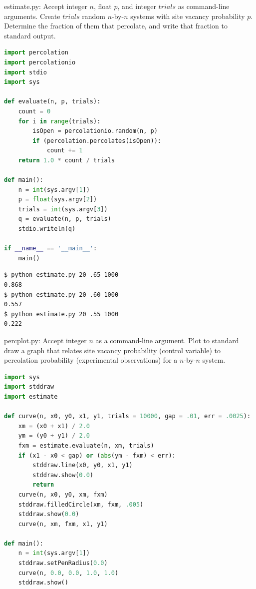 \documentclass[8pt,a4paper,compress]{beamer}
\begin{document}
\begin{frame}[fragile]
\pause

\begin{framed}
\tiny estimate.py: Accept integer $n$, float $p$, and integer $trials$ as command-line arguments. Create $trials$ random $n$-by-$n$ systems with site vacancy probability $p$. Determine the fraction of them that percolate, and
write that fraction to standard output.
\end{framed}

\begin{lstlisting}[language=Python]
import percolation
import percolationio
import stdio
import sys

def evaluate(n, p, trials):
    count = 0
    for i in range(trials):
        isOpen = percolationio.random(n, p)
        if (percolation.percolates(isOpen)):
            count += 1
    return 1.0 * count / trials

def main():
    n = int(sys.argv[1])
    p = float(sys.argv[2])
    trials = int(sys.argv[3])
    q = evaluate(n, p, trials)
    stdio.writeln(q)

if __name__ == '__main__':
    main()
\end{lstlisting}

\pause

\begin{lstlisting}[language={}]
$ python estimate.py 20 .65 1000
0.868
$ python estimate.py 20 .60 1000
0.557
$ python estimate.py 20 .55 1000
0.222
\end{lstlisting}
\end{frame}

\begin{frame}[fragile]
\pause

\begin{framed}
\tiny percplot.py:  Accept integer $n$ as a command-line argument. Plot to standard draw a graph that relates site vacancy probability (control variable) to percolation probability (experimental observations) for a $n$-by-$n$ system.
\end{framed}

\begin{lstlisting}[language=Python]
import sys
import stddraw
import estimate

def curve(n, x0, y0, x1, y1, trials = 10000, gap = .01, err = .0025):
    xm = (x0 + x1) / 2.0
    ym = (y0 + y1) / 2.0
    fxm = estimate.evaluate(n, xm, trials)
    if (x1 - x0 < gap) or (abs(ym - fxm) < err):
        stddraw.line(x0, y0, x1, y1)
        stddraw.show(0.0)
        return
    curve(n, x0, y0, xm, fxm)
    stddraw.filledCircle(xm, fxm, .005)
    stddraw.show(0.0)
    curve(n, xm, fxm, x1, y1)
    
def main():
    n = int(sys.argv[1])
    stddraw.setPenRadius(0.0)
    curve(n, 0.0, 0.0, 1.0, 1.0)
    stddraw.show()
\end{lstlisting}
\end{frame}
\end{document}
